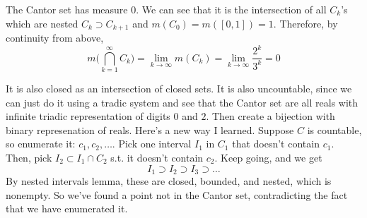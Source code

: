   \begin{example}
    The Cantor set has measure $0$. We can see that it is the intersection of all $C_k$'s which are nested $C_k \supset C_{k+1}$ and $m(C_0) = m([0, 1]) = 1$. Therefore, by continuity from above, 
    \begin{equation}
      m \bigg( \bigcap_{k=1}^\infty C_k \bigg) = \lim_{k \to \infty} m(C_k) = \lim_{k \to \infty} \frac{2^k}{3^k} = 0 
    \end{equation}

    It is also closed as an intersection of closed sets. It is also uncountable, since we can just do it using a tradic system and see that the Cantor set are all reals with infinite triadic representation of digits $0$ and $2$. Then create a bijection with binary represenation of reals. Here's a new way I learned. Suppose $C$ is countable, so enumerate it: $c_1, c_2, \ldots$. Pick one interval $I_1$ in $C_1$ that doesn't contain $c_1$. Then, pick $I_2 \subset I_1 \cap C_2$ s.t. it doesn't contain $c_2$. Keep going, and we get 
    \begin{equation}
      I_1 \supset I_2 \supset I_3 \supset \ldots 
    \end{equation}
    By nested intervals lemma, these are closed, bounded, and nested, which is nonempty. So we've found a point not in the Cantor set, contradicting the fact that we have enumerated it. 
  \end{example}

